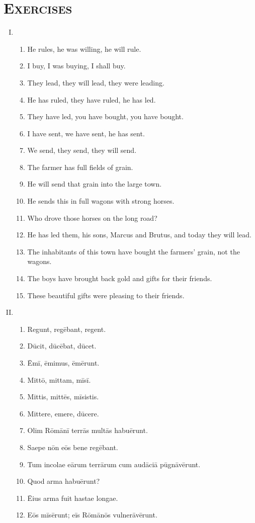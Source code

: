 \documentclass[12pt]{article}
\begin{document}
\section{\textsc{Exercises}}
\begin{enumerate}[I.]
	\setlength{\itemsep}{1em}
	\item \begin{enumerate}[1)]
		\item He rules, he was willing, he will rule.
		\item I buy, I was buying, I shall buy.
		\item They lead, they will lead, they were leading.
		\item He has ruled, they have ruled, he has led.
		\item They have led, you have bought, you have bought.
		\item I have sent, we have sent, he has sent.
		\item We send, they send, they will send.
		\item The farmer has full fields of grain.
		\item He will send that grain into the large town.
		\item He sends this in full wagons with strong horses.
		\item Who drove those horses on the long road?
		\item He has led them, his sons, Marcus and Brutus, and today they will lead.
		\item The inhabitants of this town have bought the farmers' grain, not the wagons.
		\item The boys have brought back gold and gifts for their friends.
		\item These beautiful gifts were pleasing to their friends.
	\end{enumerate}
	\item \begin{enumerate}[1)]
		\item Regunt, regēbant, regent.
		\item Dūcit, dūcēbat, dūcet.
		\item Ēmī, ēmimus, ēmērunt.
		\item Mittō, mittam, mīsī.
		\item Mittis, mittēs, mīsistis.
		\item Mittere, emere, dūcere.
		\item Olim Rōmānī terrās multās habuērunt.
		\item Saepe nōn eōs bene regēbant.
		\item Tum incolae eārum terrārum cum audāciā pūgnāvērunt.
		\item Quod arma habuērunt?
		\item Ēius arma fuit hastae longae.
		\item Eōs mīsērunt; eīs Rōmānōs vulnerāvērunt.
	\end{enumerate}
\end{enumerate}
\end{document}
